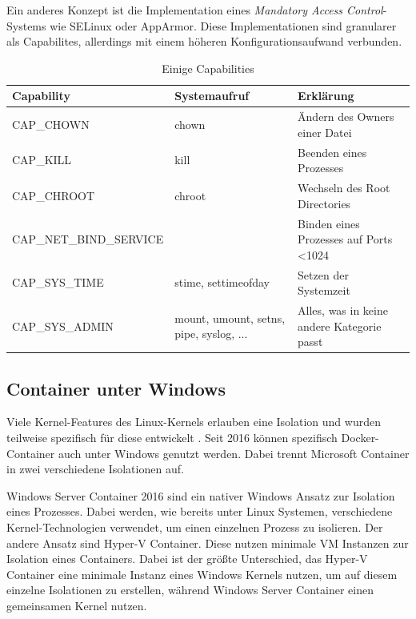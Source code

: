 Ein anderes Konzept ist die Implementation eines \textit{Mandatory Access Control}-Systems wie SELinux oder AppArmor. Diese Implementationen sind granularer als Capabilites, allerdings mit einem höheren Konfigurationsaufwand verbunden.

\begin{table}[h]
	\begin{center}
		\begin{tabu}to 0.9
			\toprule
			Capability 		& Systemaufruf 			& Erklärung						\\
			\midrule
			CAP\_CHOWN 		& chown 				& Ändern des Owners einer Datei \\
			CAP\_KILL 		& kill 					& Beenden eines Prozesses		\\
			CAP\_CHROOT		& chroot				& Wechseln des Root Directories	\\
			\midrule
			CAP\_NET\_BIND\_SERVICE & & Binden eines Prozesses auf Ports \textless 1024 \\
			\midrule
			CAP\_SYS\_TIME	& stime, settimeofday	& Setzen der Systemzeit 		\\
			CAP\_SYS\_ADMIN	& mount, umount, setns, pipe, syslog, ... 	& Alles, was in keine andere Kategorie passt 														\\
			\bottomrule
		\end{tabu}
	\end{center}
	\caption{Einige Capabilities \citep{Capabilities7LinuxManualPage}}
	\label{tab:capabilities}
\end{table}

\subsection{Container unter Windows}
\label{sec:windows}
Viele Kernel-Features des Linux-Kernels erlauben eine Isolation und wurden teilweise spezifisch für diese entwickelt \citep{Namespaces7LinuxManualPage}. Seit 2016 können spezifisch Docker-Container auch unter Windows genutzt werden. Dabei trennt Microsoft Container in zwei verschiedene Isolationen auf.

Windows Server Container 2016 sind ein nativer Windows Ansatz zur Isolation eines Prozesses. Dabei werden, wie bereits unter Linux Systemen, verschiedene Kernel-Technologien verwendet, um einen einzelnen Prozess zu isolieren. Der andere Ansatz sind Hyper-V Container. Diese nutzen minimale VM Instanzen zur Isolation eines Containers. Dabei ist der größte Unterschied, das Hyper-V Container eine minimale Instanz eines Windows Kernels nutzen, um auf diesem einzelne Isolationen zu erstellen, während Windows Server Container einen gemeinsamen Kernel nutzen.

